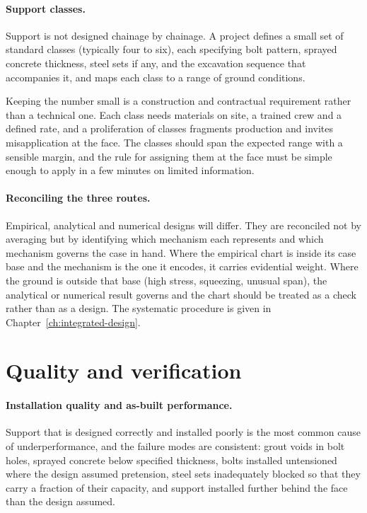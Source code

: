 \paragraph{Support classes.}
Support is not designed chainage by chainage. A project defines a small set
of standard classes (typically four to six), each specifying bolt
pattern, sprayed concrete thickness, steel sets if any, and the excavation sequence
that accompanies it, and maps each class to a range of ground conditions.

Keeping the number small is a construction and contractual requirement rather
than a technical one. Each class needs materials on site, a trained crew and a
defined rate, and a proliferation of classes fragments production and invites
misapplication at the face. The classes should span the expected range with
a sensible margin, and the rule for assigning them at the face must be simple
enough to apply in a few minutes on limited information.

\paragraph{Reconciling the three routes.}
Empirical, analytical and numerical designs will differ. They are reconciled
not by averaging but by identifying which mechanism each represents and which
mechanism governs the case in hand. Where the empirical chart is inside its
case base and the mechanism is the one it encodes, it carries evidential
weight. Where the ground is outside that base (high stress, squeezing,
unusual span), the analytical or numerical result governs and the chart
should be treated as a check rather than as a design. The systematic
procedure is given in Chapter~\ref{ch:integrated-design}.

\section{Quality and verification}
\label{sec:quality-and-verification}

\paragraph{Installation quality and as-built performance.}
Support that is designed correctly and installed poorly is the most common
cause of underperformance, and the failure modes are consistent: grout voids
in bolt holes, sprayed concrete below specified thickness, bolts installed untensioned
where the design assumed pretension, steel sets inadequately blocked so that
they carry a fraction of their capacity, and support installed further behind
the face than the design assumed.

